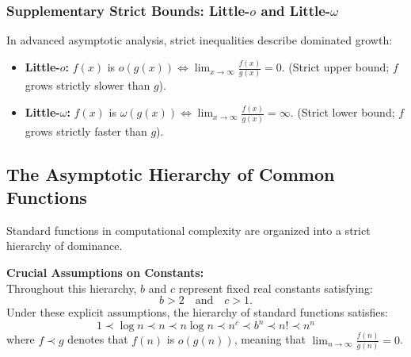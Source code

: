 \documentclass[10pt,a4paper]{article}
\theoremstyle{definition}
\begin{document}
\subsubsection{Supplementary Strict Bounds: Little-$o$ and Little-$\omega$}
In advanced asymptotic analysis, strict inequalities describe dominated growth:
\begin{itemize}[leftmargin=*,itemsep=0pt,topsep=1pt]
    \item \textbf{Little-$o$:} $f(x)$ is $o(g(x)) \iff \lim_{x \to \infty} \frac{f(x)}{g(x)} = 0$. (Strict upper bound; $f$ grows strictly slower than $g$).
    \item \textbf{Little-$\omega$:} $f(x)$ is $\omega(g(x)) \iff \lim_{x \to \infty} \frac{f(x)}{g(x)} = \infty$. (Strict lower bound; $f$ grows strictly faster than $g$).
\end{itemize}

\subsection{The Asymptotic Hierarchy of Common Functions}
Standard functions in computational complexity are organized into a strict hierarchy of dominance. 

\noindent\textbf{Crucial Assumptions on Constants:}\\
Throughout this hierarchy, $b$ and $c$ represent fixed real constants satisfying:
\begin{equation}
b > 2 \quad \text{and} \quad c > 1.
\end{equation}
Under these explicit assumptions, the hierarchy of standard functions satisfies:
\begin{equation}
1 \prec \log n \prec n \prec n \log n \prec n^c \prec b^n \prec n! \prec n^n
\end{equation}
where $f \prec g$ denotes that $f(n)$ is $o(g(n))$, meaning that $\lim_{n \to \infty} \frac{f(n)}{g(n)} = 0$.
\end{document}

